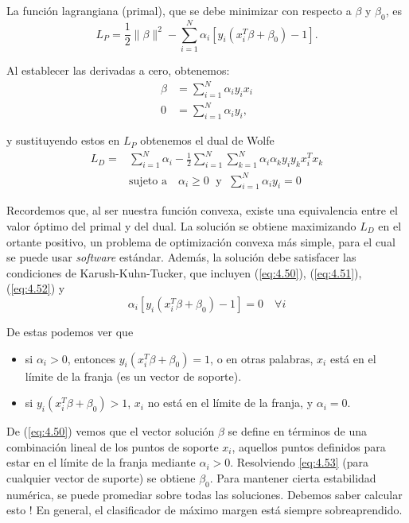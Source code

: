 \noindent La función lagrangiana (primal), que se debe minimizar con respecto a $\beta$ y $\beta_0$, es
\begin{equation}
L_P = \frac{1}{2} \|\beta\|^2 - \sum_{i=1}^N \alpha_i [y_i (x_i^T \beta + \beta_0) - 1].
\end{equation}

\noindent Al establecer las derivadas a cero, obtenemos:
\begin{align}
\beta &= \sum_{i=1}^N \alpha_i y_i x_i \label{eq:4.50}\\
0 &= \sum_{i=1}^N \alpha_i y_i, \label{eq:4.51}
\end{align}

\noindent y sustituyendo estos en $L_P$ obtenemos el dual de Wolfe
\begin{align}
L_D =& \sum_{i=1}^N \alpha_i - \frac{1}{2} \sum_{i=1}^N \sum_{k=1}^N \alpha_i \alpha_k y_i y_k x_i^T x_k \\
& \text{sujeto a} \quad \alpha_i \geq 0 \; \text{ y } \; \sum_{i=1}^N \alpha_i y_i = 0 \label{eq:4.52}
\end{align}

Recordemos que, al ser nuestra función convexa, existe una equivalencia entre el valor óptimo del primal y del dual. La solución se obtiene maximizando $L_D$ en el ortante positivo, un problema de optimización convexa más simple, para el cual se puede usar \textit{software} estándar. Además, la solución debe satisfacer las condiciones de Karush-Kuhn-Tucker, que incluyen (\ref{eq:4.50}), (\ref{eq:4.51}), (\ref{eq:4.52}) y
\begin{equation}
\alpha_i [y_i (x_i^T \beta + \beta_0) - 1] = 0 \quad \forall i \label{eq:4.53}
\end{equation}

\noindent De estas podemos ver que
\begin{itemize}
    \item si $\alpha_i > 0$, entonces $y_i (x_i^T \beta + \beta_0) = 1$, o en otras palabras, $x_i$ está en el límite de la franja (es un vector de soporte).
    \item si $y_i (x_i^T \beta + \beta_0) > 1$, $x_i$ no está en el límite de la franja, y $\alpha_i = 0$.
\end{itemize}

De (\ref{eq:4.50}) vemos que el vector solución $\beta$ se define en términos de una combinación lineal de los puntos de soporte $x_i$, aquellos puntos definidos para estar en el límite de la franja mediante $\alpha_i > 0$. Resolviendo \ref{eq:4.53} (para cualquier vector de suporte) se obtiene $\beta_0$. Para mantener cierta estabilidad numérica, se puede promediar sobre todas las soluciones. Debemos saber calcular esto ! En general, el clasificador de máximo margen está siempre sobreaprendido. \\


